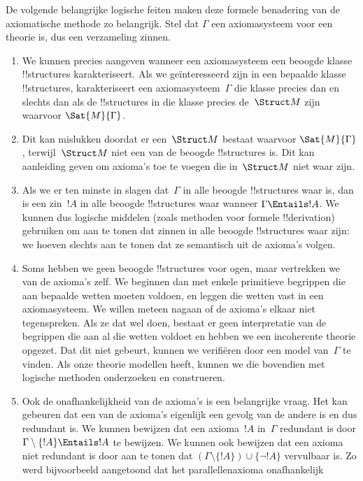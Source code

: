 \documentclass[openany]{memoir}
\begin{document}
\begin{explain}
De volgende belangrijke logische feiten maken deze formele benadering
van de axiomatische methode zo belangrijk. Stel dat $\Gamma$ een
axiomasysteem voor een theorie is, dus een verzameling zinnen.
\begin{enumerate}
\item We kunnen precies aangeven wanneer een axiomasysteem een beoogde
  klasse !!{structure}s karakteriseert. Als we geïnteresseerd zijn in
  een bepaalde klasse !!{structure}s, karakteriseert een
  axiomasysteem~$\Gamma$ die klasse precies dan en slechts dan als de
  !!{structure}s in die klasse precies de~$\Struct M$ zijn waarvoor
  $\Sat{M}{\Gamma}$.
\item Dit kan mislukken doordat er een~$\Struct M$ bestaat waarvoor
  $\Sat{M}{\Gamma}$, terwijl~$\Struct M$ niet een van de beoogde
  !!{structure}s is. Dit kan aanleiding geven om axioma's toe te
  voegen die in~$\Struct M$ niet waar zijn.
\item Als we er ten minste in slagen dat~$\Gamma$ in alle beoogde
  !!{structure}s waar is, dan is een zin~$!A$ in alle beoogde
  !!{structure}s waar wanneer $\Gamma \Entails !A$. We kunnen dus
  logische middelen (zoals methoden voor formele !!{derivation})
  gebruiken om aan te tonen dat zinnen in alle beoogde !!{structure}s
  waar zijn: we hoeven slechts aan te tonen dat ze semantisch uit de
  axioma's volgen.
\item Soms hebben we geen beoogde !!{structure}s voor ogen, maar
  vertrekken we van de axioma's zelf. We beginnen dan met enkele
  primitieve begrippen die aan bepaalde wetten moeten voldoen, en
  leggen die wetten vast in een axiomasysteem. We willen meteen nagaan
  of de axioma's elkaar niet tegenspreken. Als ze dat wel doen, bestaat
  er geen interpretatie van de begrippen die aan al die wetten voldoet
  en hebben we een incoherente theorie opgezet. Dat dit niet gebeurt,
  kunnen we verifiëren door een model van~$\Gamma$ te vinden. Als onze
  theorie modellen heeft, kunnen we die bovendien met logische methoden
  onderzoeken en construeren.
\item Ook de onafhankelijkheid van de axioma's is een belangrijke
  vraag. Het kan gebeuren dat een van de axioma's eigenlijk een gevolg
  van de andere is en dus redundant is. We kunnen bewijzen dat een
  axioma~$!A$ in~$\Gamma$ redundant is door
  $\Gamma \setminus \{!A\} \Entails !A$ te bewijzen. We kunnen ook
  bewijzen dat een axioma niet redundant is door aan te tonen dat
  $(\Gamma \setminus \{!A\}) \cup \{\lnot !A\}$ vervulbaar is. Zo
  werd bijvoorbeeld aangetoond dat het parallellenaxioma onafhankelijk

\end{enumerate}
\end{explain}
\end{document}
